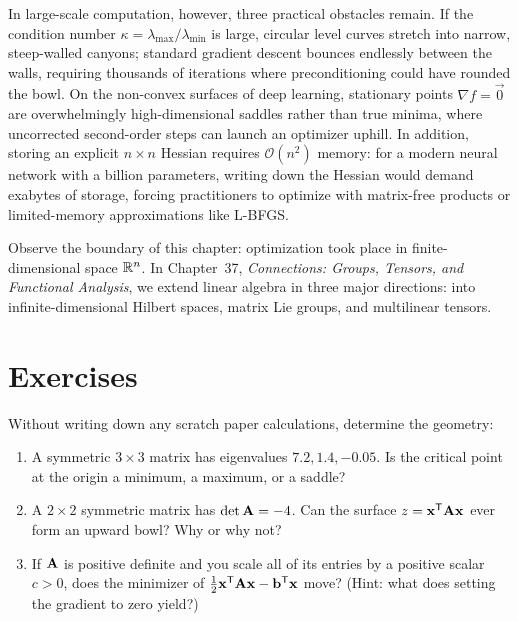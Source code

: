 In large-scale computation, however, three practical obstacles remain. If
the condition number $\kappa = \lambda_{\max}/\lambda_{\min}$ is large, circular level
curves stretch into narrow, steep-walled canyons; standard gradient descent bounces
endlessly between the walls, requiring thousands of iterations where preconditioning
could have rounded the bowl. On the non-convex surfaces of deep learning, stationary
points $\nabla f = \vec{0}$ are overwhelmingly high-dimensional saddles rather than true
minima, where uncorrected second-order steps can launch an optimizer uphill.
In addition, storing an explicit $n\times n$ Hessian requires $\mathcal{O}(n^2)$ memory:
for a modern neural network with a billion parameters, writing down the Hessian would
demand exabytes of storage, forcing practitioners to optimize with matrix-free products
or limited-memory approximations like L-BFGS.

Observe the boundary of this chapter: optimization took place in
finite-dimensional space $\mathbb{R}^n$. In Chapter~37, \emph{Connections: Groups,
Tensors, and Functional Analysis}, we extend linear algebra in three major directions:
into infinite-dimensional Hilbert spaces, matrix Lie groups, and multilinear tensors.

\section*{Exercises}

\begin{exercise}
\label{ch36:exr-mental-shapes}
Without writing down any scratch paper calculations, determine the geometry:
\begin{enumerate}
  \item A symmetric $3\times 3$ matrix has eigenvalues $7.2, 1.4, -0.05$. Is the critical point at the origin a minimum, a maximum, or a saddle?
  \item A $2\times 2$ symmetric matrix has $\det\mathbf{A} = -4$. Can the surface $z = \mathbf{x}^{\mathsf{T}}\mathbf{A}\mathbf{x}$ ever form an upward bowl? Why or why not?
  \item If $\mathbf{A}$ is positive definite and you scale all of its entries by a positive scalar $c > 0$, does the minimizer of $\tfrac12\mathbf{x}^{\mathsf{T}}\mathbf{A}\mathbf{x} - \mathbf{b}^{\mathsf{T}}\mathbf{x}$ move? (Hint: what does setting the gradient to zero yield?)
\end{enumerate}
\end{exercise}

